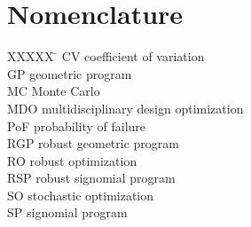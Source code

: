 \section*{Nomenclature}

\begin{tabbing}
  XXXXX \= \kill%
  CV \> coefficient of variation \\
  GP \> geometric program \\
  MC \> Monte Carlo \\
  MDO \> multidisciplinary design optimization \\
  PoF \> probability of failure \\
  RGP \> robust geometric program \\
  RO \> robust optimization \\
  RSP \> robust signomial program \\
  SO \> stochastic optimization \\
  SP \> signomial program \\
 \end{tabbing}
